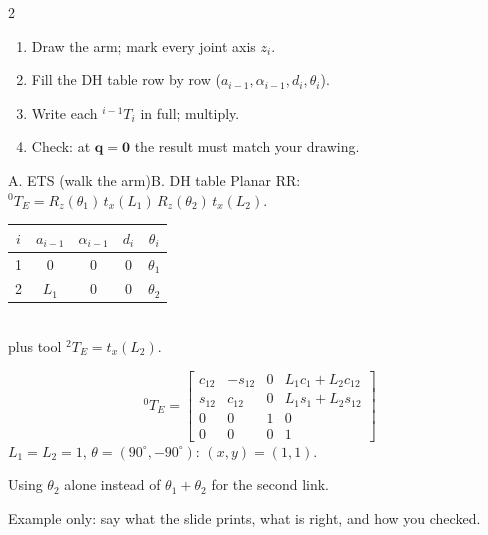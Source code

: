 \begin{multicols}{2}
\begin{recipe}
\begin{enumerate}
\item Draw the arm; mark every joint axis $z_i$.
\item Fill the DH table row by row ($a_{i-1},\alpha_{i-1},d_i,\theta_i$).
\item Write each ${}^{i-1}T_i$ in full; multiply.
\item Check: at $\mathbf q=\mathbf 0$ the result must match your drawing.
\end{enumerate}
\end{recipe}

\begin{twoway}{A. ETS (walk the arm)}{B. DH table}
Planar RR: ${}^0T_E=R_z(\theta_1)\,t_x(L_1)\,R_z(\theta_2)\,t_x(L_2)$.
\tcblower
\begin{tabular}{@{}ccccc@{}}\toprule $i$&$a_{i-1}$&$\alpha_{i-1}$&$d_i$&$\theta_i$\\\midrule 1&0&0&0&$\theta_1$\\ 2&$L_1$&0&0&$\theta_2$\\\bottomrule\end{tabular}\\ plus tool ${}^2T_E=t_x(L_2)$.
\end{twoway}

\begin{worked}
\[{}^0T_E=\begin{bmatrix}c_{12}&-s_{12}&0&L_1c_1+L_2c_{12}\\ s_{12}&c_{12}&0&L_1s_1+L_2s_{12}\\0&0&1&0\\0&0&0&1\end{bmatrix}\]
$L_1=L_2=1$, $\theta=(90^\circ,-90^\circ)$: $(x,y)=(1,1)$. \chk
\end{worked}

\begin{trap}
Using $\theta_2$ alone instead of $\theta_1+\theta_2$ for the second link.
\end{trap}

\begin{slideerr}
Example only: say what the slide prints, what is right, and how you checked.
\end{slideerr}



\end{multicols}
